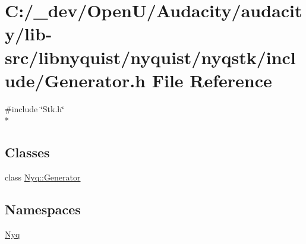 \hypertarget{lib-src_2libnyquist_2nyquist_2nyqstk_2include_2_generator_8h}{}\section{C\+:/\+\_\+dev/\+Open\+U/\+Audacity/audacity/lib-\/src/libnyquist/nyquist/nyqstk/include/\+Generator.h File Reference}
\label{lib-src_2libnyquist_2nyquist_2nyqstk_2include_2_generator_8h}
{\ttfamily \#include \char`\"{}Stk.\+h\char`\"{}}\\*
\subsection*{Classes}
\begin{DoxyCompactItemize}
\item 
class \hyperlink{class_nyq_1_1_generator}{Nyq\+::\+Generator}
\end{DoxyCompactItemize}
\subsection*{Namespaces}
\begin{DoxyCompactItemize}
\item 
 \hyperlink{namespace_nyq}{Nyq}
\end{DoxyCompactItemize}
